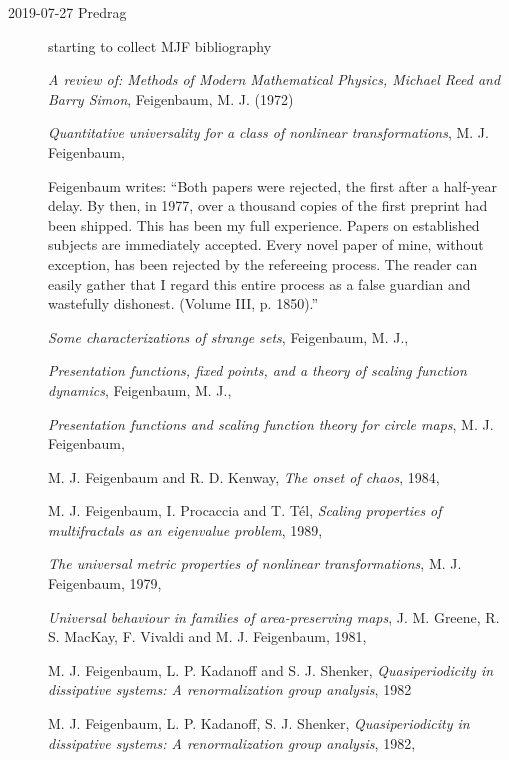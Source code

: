 \begin{description}
\item[2019-07-27 Predrag]
starting to collect MJF bibliography

{\em A review of:
{Methods of Modern Mathematical Physics, Michael Reed and Barry Simon}},
{Feigenbaum, M. J.} (1972)

{\em Quantitative universality for a class of nonlinear transformations},
{M. J. Feigenbaum},

Feigenbaum writes:
``Both papers were rejected, the first after a half-year delay. By then,
in 1977, over a thousand  copies  of  the  first  preprint  had  been
shipped.  This  has  been  my  full  experience. Papers on established
subjects are immediately accepted. Every novel paper of mine, without
exception, has been rejected by the refereeing process. The reader  can
easily  gather  that  I  regard  this  entire  process  as  a  false
guardian  and  wastefully dishonest. (Volume III, p.
1850).''

{\em Some characterizations of strange sets},
{Feigenbaum, M. J.},

{\em Presentation functions, fixed points, and a theory of scaling function dynamics},
{Feigenbaum, M. J.},

{\em Presentation functions and scaling function theory for circle maps},
{M. J. Feigenbaum},

{M. J. Feigenbaum and R. D. Kenway},
{\em The onset of chaos},
{1984},

{M. J. Feigenbaum, I. Procaccia and T. T{\'e}l},
  {\em Scaling properties of multifractals as an eigenvalue problem},
{1989},

{\em The universal metric properties of nonlinear transformations},
{M. J. Feigenbaum},
{1979},

{\em Universal behaviour in families of area-preserving maps},
{J. M. Greene, R. S. MacKay, F. Vivaldi and M. J. Feigenbaum},
{1981},

{M. J. Feigenbaum, L. P. Kadanoff and S. J. Shenker},
  {\em Quasiperiodicity in dissipative systems: {A} renormalization group analysis},
{1982}

{M. J. Feigenbaum, L. P. Kadanoff, S. J. Shenker},
  {\em Quasiperiodicity in dissipative systems: {A} renormalization group analysis},
{1982},


\end{description}
